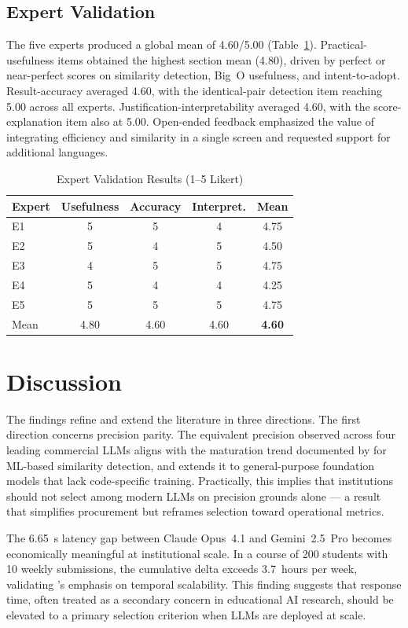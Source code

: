 \documentclass[twocolumn,11pt]{article}
\begin{document}
    \subsection{Expert Validation}
    The five experts produced a global mean of 4.60/5.00 (Table~\ref{tab:experts}). Practical-usefulness items obtained the highest section mean (4.80), driven by perfect or near-perfect scores on similarity detection, Big~O usefulness, and intent-to-adopt. Result-accuracy averaged 4.60, with the identical-pair detection item reaching 5.00 across all experts. Justification-interpretability averaged 4.60, with the score-explanation item also at 5.00. Open-ended feedback emphasized the value of integrating efficiency and similarity in a single screen and requested support for additional languages.
    \begin{table}[!t]
    \caption{Expert Validation Results (1--5 Likert)}\label{tab:experts}
    \centering\small
    \begin{tabular}{@{}lcccc@{}}\toprule
    Expert & Usefulness & Accuracy & Interpret. & Mean \\\midrule
    E1 & 5 & 5 & 4 & 4.75 \\
    E2 & 5 & 4 & 5 & 4.50 \\
    E3 & 4 & 5 & 5 & 4.75 \\
    E4 & 5 & 4 & 4 & 4.25 \\
    E5 & 5 & 5 & 5 & 4.75 \\\midrule
    Mean & 4.80 & 4.60 & 4.60 & \textbf{4.60} \\\bottomrule
    \end{tabular}
    \end{table}
    \section{Discussion}\label{sec:discussion}
    The findings refine and extend the literature in three directions. The first direction concerns precision parity. The equivalent precision observed across four leading commercial LLMs aligns with the maturation trend documented by \citet{zhang2025machine} for ML-based similarity detection, and extends it to general-purpose foundation models that lack code-specific training. Practically, this implies that institutions should not select among modern LLMs on precision grounds alone --- a result that simplifies procurement but reframes selection toward operational metrics.
     
    The 6.65~s latency gap between Claude Opus~4.1 and Gemini~2.5~Pro becomes economically meaningful at institutional scale. In a course of 200 students with 10 weekly submissions, the cumulative delta exceeds 3.7~hours per week, validating \citet{franclinton2020scalable}'s emphasis on temporal scalability. This finding suggests that response time, often treated as a secondary concern in educational AI research, should be elevated to a primary selection criterion when LLMs are deployed at scale.
     
\end{document}
